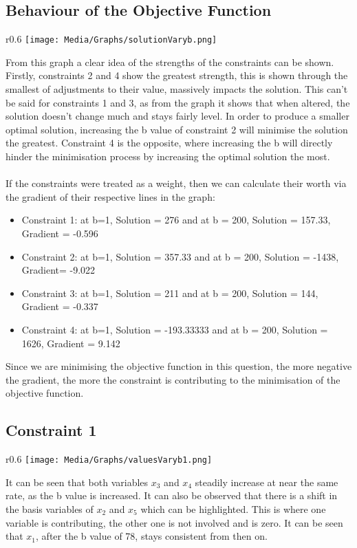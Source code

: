\documentclass{article}
\numberwithin{equation}{section}
\begin{document}
\subsection{Behaviour of the Objective Function}
\begin{wrapfigure}{r}{0.6\textwidth}
    \centering
    \texttt{[image: Media/Graphs/solutionVaryb.png]}
\end{wrapfigure}
From this graph a clear idea of the strengths of the constraints can be shown. Firstly, constraints 2 and 4 show the greatest strength, this is shown through the smallest of adjustments to their value, massively impacts the solution. This can't be said for constraints 1 and 3, as from the graph it shows that when altered, the solution doesn't change much and stays fairly level. In order to produce a smaller optimal solution, increasing the b value of constraint 2 will minimise the solution the greatest. Constraint 4 is the opposite, where increasing the b will directly hinder the minimisation process by increasing the optimal solution the most. \\ \\
If the constraints were treated as a weight, then we can calculate their worth via the gradient of their respective lines in the graph:
\begin{itemize}
    \item Constraint 1: at b=1, Solution = 276 and at b = 200, Solution = 157.33,    Gradient = -0.596
    \item Constraint 2: at b=1, Solution = 357.33 and at b = 200, Solution = -1438, Gradient= -9.022
    \item Constraint 3: at b=1, Solution = 211 and at b = 200, Solution = 144, Gradient = -0.337
    \item Constraint 4: at b=1, Solution = -193.33333 and at b = 200, Solution = 1626, Gradient = 9.142
\end{itemize}
Since we are minimising the objective function in this question, the more negative the gradient, the more the constraint is contributing to the minimisation of the objective function.
\subsection{Constraint 1}
\begin{wrapfigure}{r}{0.6\textwidth}
    \centering
    \texttt{[image: Media/Graphs/valuesVaryb1.png]}
\end{wrapfigure}
It can be seen that both variables $x_3$ and $x_4$ steadily increase at near the same rate, as the b value is increased. It can also be observed that there is a shift in the basis variables of $x_2$ and $x_5$ which can be highlighted. This is where one variable is contributing, the other one is not involved and is zero. It can be seen that $x_1$, after the b value of 78, stays consistent from then on. 
\newpage
\end{document}
